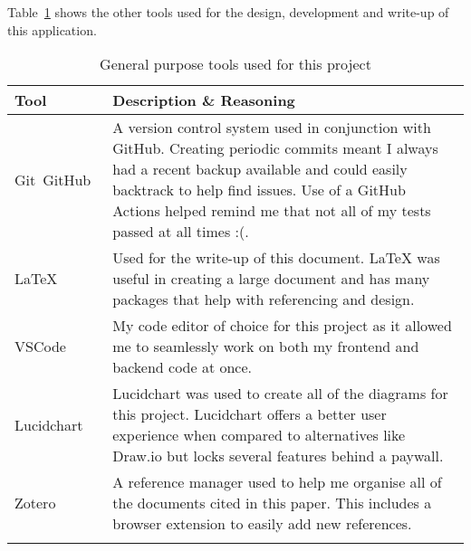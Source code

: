 Table~\ref{tab:tools-other} shows the other tools used for the design, development and write-up of this application.

\begin{longtable}{p{} p{}}
  \toprule
  \textbf{Tool} & \textbf{Description \& Reasoning}
  \\\midrule\midrule
  Git~\cite{noauthor_git_nodate}\newline GitHub~\cite{noauthor_github_nodate}
  & \small A version control system used in conjunction with GitHub. Creating periodic commits meant I always had a recent backup available and could easily backtrack to help find issues.
  Use of a GitHub Actions helped remind me that not all of my tests passed at all times :(.\\
  LaTeX~\cite{noauthor_latex_nodate}
  & \small Used for the write-up of this document. LaTeX was useful in creating a large document and has many packages that help with referencing and design.\\
  VSCode~\cite{noauthor_visual_nodate}
  & \small My code editor of choice for this project as it allowed me to seamlessly work on both my frontend and backend code at once. \\
  Lucidchart~\cite{noauthor_lucidchart_nodate}
  & \small Lucidchart was used to create all of the diagrams for this project. Lucidchart offers a better user experience when compared to alternatives like Draw.io but locks several features behind a paywall. \\
  Zotero~\cite{noauthor_zotero_nodate}
  & \small A reference manager used to help me organise all of the documents cited in this paper. This includes a browser extension to easily add new references.
  \\\bottomrule\bottomrule
  \caption{General purpose tools used for this project}
  \label{tab:tools-other}
\end{longtable}
